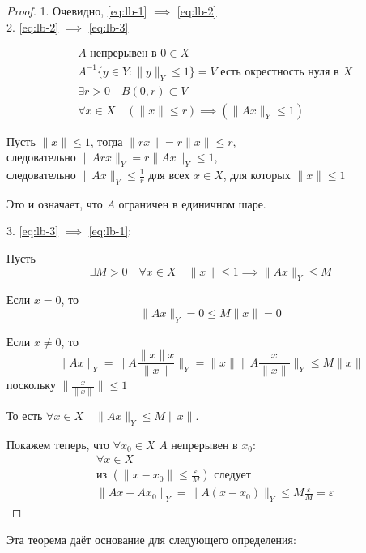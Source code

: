 \begin{proof}

1. Очевидно, \eqref{eq:lb-1} $\implies$ \eqref{eq:lb-2} \\

2. \eqref{eq:lb-2} $\implies$ \eqref{eq:lb-3} 

\begin{align*}
& A \text{ непрерывен в } 0\in X \\
& A^{-1}\{y\in Y: \|y\|_Y \leq 1\} = V\text{ есть окрестность нуля в } X \\
& \exists r>0 \quad B(0, r)\subset V \\
& \forall x\in X \quad (\|x\| \leq r) \implies (\|A x\|_Y \leq 1)
\end{align*}

Пусть $\|x\|\leq 1$, тогда $\|rx\| = r\|x\| \leq r$,\\
следовательно ${\|A rx\|_Y = r \|A x\|_Y \leq 1}$,\\
следовательно ${\|A x\|_Y \leq \frac{1}{r}}$
для всех $x\in X$, для которых $\|x\|\leq 1$

Это и означает, что $A$ ограничен в единичном шаре.

3. \eqref{eq:lb-3} $\implies$ \eqref{eq:lb-1}:

Пусть
 $$\exists M>0 \quad \forall x\in X \quad \|x\|\leq 1 \implies \|A x\|_Y \leq M$$

Если $x=0$, то $$\|A x\|_Y = 0 \leq M\|x\| = 0$$

Если $x\neq 0$, то
$$\|A x\|_Y = \|A \frac{\|x\|x}{\|x\|}\|_Y = \|x\| \|A \frac{x}{\|x\|}\|_Y \leq M \|x\|$$
поскольку  $\|\frac{x}{\|x\|}\|\leq 1$

То есть $\forall x\in X \quad \|A x\|_Y \leq M \|x\|$.

Покажем теперь, что $\forall x_0\in X$ $A$ непрерывен в $x_0$:
\begin{align*}
& \forall x\in X\\
& \text{из } (\|x - x_0\| \leq \frac{\varepsilon}{M}) \text{ следует } \\
& \|A x - A x_0\|_Y = \|A (x - x_0)\|_Y \leq M \frac{\varepsilon}{M} = \varepsilon
\end{align*}

\end{proof}

Эта теорема даёт основание для следующего определения:

